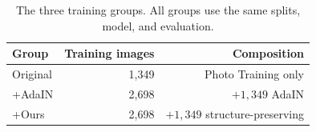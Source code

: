 \begin{table}[t]
\caption{The three training groups. All groups use the same splits, model, and evaluation.}
\label{tab:groups}
\centering
\small
\setlength{\tabcolsep}{4pt}
\begin{tabular}{@{}lrr@{}}
\toprule
Group & Training images & Composition \\
\midrule
Original & 1{,}349 & Photo Training only \\
+AdaIN   & 2{,}698 & $+ 1{,}349$ AdaIN \\
+Ours    & 2{,}698 & $+ 1{,}349$ structure-preserving \\
\bottomrule
\end{tabular}
\end{table}
